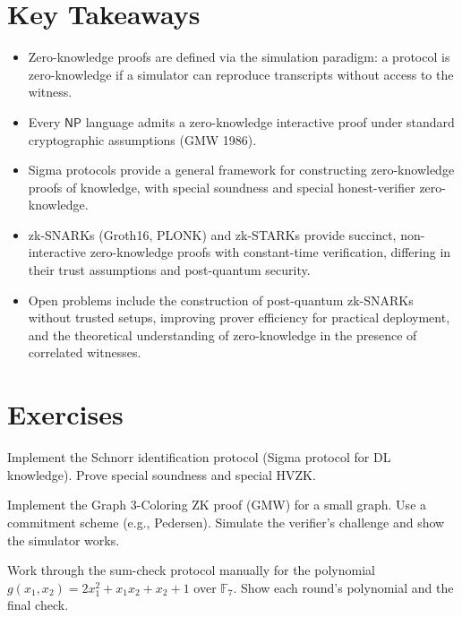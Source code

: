 \section*{Key Takeaways}
\begin{itemize}
\item Zero-knowledge proofs are defined via the simulation paradigm: a protocol is zero-knowledge if a simulator can reproduce transcripts without access to the witness.
\item Every $\mathsf{NP}$ language admits a zero-knowledge interactive proof under standard cryptographic assumptions (GMW 1986).
\item Sigma protocols provide a general framework for constructing zero-knowledge proofs of knowledge, with special soundness and special honest-verifier zero-knowledge.
\item zk-SNARKs (Groth16, PLONK) and zk-STARKs provide succinct, non-interactive zero-knowledge proofs with constant-time verification, differing in their trust assumptions and post-quantum security.
\item Open problems include the construction of post-quantum zk-SNARKs without trusted setups, improving prover efficiency for practical deployment, and the theoretical understanding of zero-knowledge in the presence of correlated witnesses.
\end{itemize}

\section{Exercises}
\label{sec:zk:exercises}

\begin{exercise}[Basic]
Implement the Schnorr identification protocol (Sigma protocol for DL knowledge). Prove special soundness and special HVZK.
\end{exercise}

\begin{exercise}[Basic]
Implement the Graph 3-Coloring ZK proof (GMW) for a small graph. Use a commitment scheme (e.g., Pedersen). Simulate the verifier's challenge and show the simulator works.
\end{exercise}

\begin{exercise}[Basic]
Work through the sum-check protocol manually for the polynomial $g(x_1,x_2) = 2x_1^2 + x_1x_2 + x_2 + 1$ over $\mathbb{F}_7$. Show each round's polynomial and the final check.
\end{exercise}

